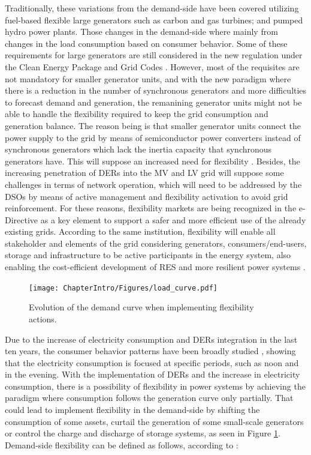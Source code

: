 Traditionally, these variations from the demand-side have been covered utilizing fuel-based flexible large generators such as carbon and gas turbines; and pumped hydro power plants. Those changes in the demand-side where mainly from changes in the load consumption based on consumer behavior.
Some of these requirements for large generators are still considered in the new regulation under the Clean Energy Package and Grid Codes \cite{validzic2017clean}. However, most of the requisites are not mandatory for smaller generator units, and with the new paradigm where there is a reduction in the number of synchronous generators and more difficulties to forecast demand and generation, the remanining generator units might not be able to handle the flexibility required to keep the grid consumption and generation balance. The reason being is that smaller generator units connect the power supply to the grid by means of semiconductor power converters instead of synchronous generators which lack the inertia capacity that synchronous generators have.  This will suppose an increased need for flexibility \cite{Xu2019}. Besides, the increasing penetration of DERs into the MV and LV grid will suppose some challenges in terms of network operation, which will need to be addressed by the DSOs by means of active management and flexibility activation to avoid grid reinforcement. For these reasons, flexibility markets are being recognized in the e-Directive \cite{Directive2019944} as a key element to support a safer and more efficient use of the already existing grids.
According to the same institution, flexibility will enable all stakeholder and elements of the grid considering generators, consumers/end-users, storage and infrastructure to be active participants in the energy system, also enabling the cost-efficient development of RES and more resilient power systems \cite{Hillberg2019}.  

\begin{figure}[h]
	\centering 
	\texttt{[image: ChapterIntro/Figures/load\_curve.pdf]}
		\caption{Evolution of the demand curve when implementing flexibility actions.}  
		\label{fig:load_shifting}
\end{figure}

Due to the increase of electricity consumption and DERs integration in the last ten years, the consumer behavior patterns have been broadly studied \cite{ZHOU201773,TORRITI2014265}, showing that the electricity consumption is focused at specific periods, such as noon and in the evening. With the implementation of DERs and the increase in electricity consumption, there is a possibility of flexibility in power systems by achieving the paradigm where consumption follows the generation curve only partially. That could lead to implement flexibility in the demand-side by shifting the consumption of some assets, curtail the generation of some small-scale generators or control the charge and discharge of storage systems, as seen in Figure \ref{fig:load_shifting}. Demand-side flexibility can be defined as follows, according to \cite{EuropeanSmartGridsTaskForceExpertGroup32019}: 

